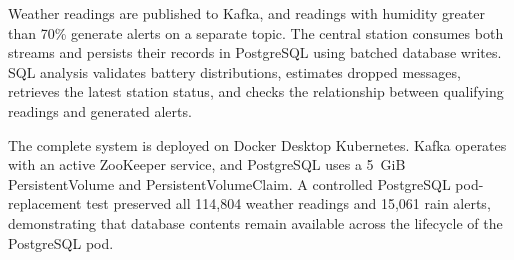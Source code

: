 \documentclass[12pt,a4paper]{article}
\begin{document}
Weather readings are published to Kafka, and readings with humidity greater than 70\% generate alerts on a separate topic. The central station consumes both streams and persists their records in PostgreSQL using batched database writes. SQL analysis validates battery distributions, estimates dropped messages, retrieves the latest station status, and checks the relationship between qualifying readings and generated alerts.

The complete system is deployed on Docker Desktop Kubernetes. Kafka operates with an active ZooKeeper service, and PostgreSQL uses a 5~GiB PersistentVolume and PersistentVolumeClaim. A controlled PostgreSQL pod-replacement test preserved all 114,804 weather readings and 15,061 rain alerts, demonstrating that database contents remain available across the lifecycle of the PostgreSQL pod.
\end{document}

